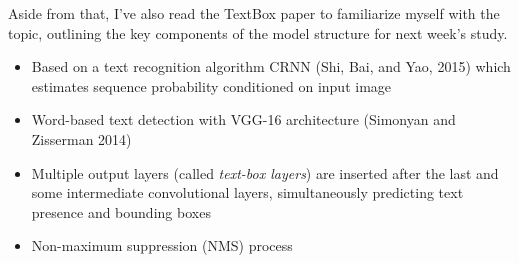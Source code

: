 \documentclass{article}
\begin{document}
Aside from that, I've also read the TextBox paper to familiarize myself with the topic, outlining the key components of the model structure for next week's study.
\begin{itemize}
	\item Based on a text recognition algorithm CRNN (Shi, Bai, and Yao, 2015) which estimates sequence probability conditioned on input image
	\item Word-based text detection with VGG-16 architecture (Simonyan and Zisserman 2014)
	\item Multiple output layers (called \textit{text-box layers}) are inserted after the last and some intermediate convolutional layers, simultaneously predicting text presence and bounding boxes
	\item Non-maximum suppression (NMS) process
\end{itemize}



\end{document}
